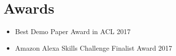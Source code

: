 \section{Awards}
\begin{itemize}
\setlength\itemsep{-5pt}
\item Best Demo Paper Award in ACL 2017
\item Amazon Alexa Skills Challenge Finalist Award 2017
\end{itemize}